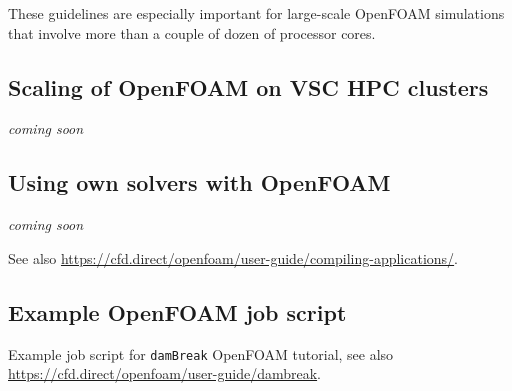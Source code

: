 These guidelines are especially important for large-scale OpenFOAM simulations that involve
more than a couple of dozen of processor cores.


\subsection{Scaling of OpenFOAM on VSC HPC clusters}
\label{sec:best-practices-openfoam-scaling}

\textit{coming soon}


\subsection{Using own solvers with OpenFOAM}
\label{sec:best-practices-openfoam-own-solvers-libraries}

\textit{coming soon}

See also {\small\url{https://cfd.direct/openfoam/user-guide/compiling-applications/}}.


\subsection{Example OpenFOAM job script}
\label{sec:best-practices-openfoam-example-script}

Example job script for {\small\texttt{damBreak}} OpenFOAM tutorial,
see also {\small\url{https://cfd.direct/openfoam/user-guide/dambreak}}.

